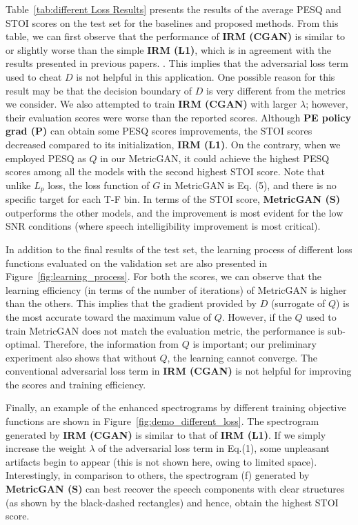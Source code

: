 \documentclass{article}
\begin{document}
Table~\ref{tab:different Loss Results} presents the results of the average PESQ and STOI scores on the test set for the baselines and proposed methods. From this table, we can first observe that the performance of \textbf{IRM (CGAN)} is similar to or slightly worse than the simple \textbf{IRM (L1)}, which is in agreement with the results presented in previous papers.
\cite{pandey2018adversarial,donahue2018exploring}. This implies that the adversarial loss term used to cheat $D$ is not helpful in this application. One possible reason for this result may be that the decision boundary of $D$ is very different from the metrics we consider. We also attempted to train \textbf{IRM (CGAN)} with larger $\lambda$; however, their evaluation scores were worse than the reported scores. Although \textbf{PE policy grad (P)} can obtain some PESQ scores improvements, the STOI scores decreased compared to its initialization, \textbf{IRM (L1)}. On the contrary, when we employed PESQ as $Q$ in our MetricGAN, it could achieve the highest PESQ scores among all the models with the second highest STOI score. Note that unlike $L_p$ loss, the loss function of $G$ in MetricGAN is Eq. (5), and there is no specific target for each T-F bin. In terms of the STOI score, \textbf{MetricGAN (S)} outperforms the other models, and the improvement is most evident for the low SNR conditions (where speech intelligibility improvement is most critical).

In addition to the final results of the test set, the learning process of different loss functions evaluated on the validation set are also presented in Figure~\ref{fig:learning_process}. For both the scores, we can observe that the learning efficiency (in terms of the number of iterations) of MetricGAN is higher than the others. This implies that the gradient provided by $D$ (surrogate of $Q$) is the most accurate toward the maximum value of $Q$. However, if the $Q$ used to train MetricGAN does not match the evaluation metric, the performance is sub-optimal. Therefore, the information from $Q$ is important; our preliminary experiment also shows that without $Q$, the learning cannot converge. The conventional adversarial loss term in \textbf{IRM (CGAN)} is not helpful for improving the scores and training efficiency.

Finally, an example of the enhanced spectrograms by different training objective functions are shown in Figure~\ref{fig:demo_different_loss}. The spectrogram generated by \textbf{IRM (CGAN)} is similar to that of \textbf{IRM (L1)}. If we simply increase the weight $\lambda$ of the adversarial loss term in Eq.(1), some unpleasant artifacts begin to appear (this is not shown here, owing to limited space). Interestingly, in comparison to others, the spectrogram (f) generated by \textbf{MetricGAN (S)} can best recover the speech components with clear structures (as shown by the black-dashed rectangles) and hence, obtain the highest STOI score.
\end{document}
